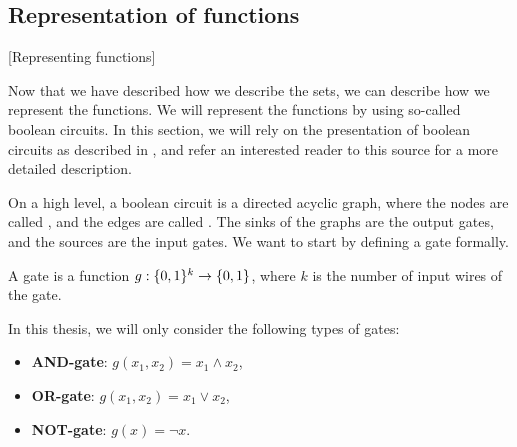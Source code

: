 \subsection{Representation of functions}[Representing functions]

Now that we have described how we describe the sets, we can describe how we represent the functions. We will represent the functions by using so-called boolean circuits. In this section, we will rely on the presentation of boolean circuits as described in , and refer an interested reader to this source for a more detailed description.

On a high level, a boolean circuit is a directed acyclic graph, where the nodes are called , and the edges are called . The sinks of the graphs are the output gates, and the sources are the input gates. We want to start by defining a gate formally.

\begin{definition}[Gate]
    A gate is a function $g : \{0, 1\}^k \rightarrow \{0, 1\}$, where $k$ is the number of input wires of the gate.
\end{definition}

In this thesis, we will only consider the following types of gates:
\begin{itemize}
    \item \textbf{AND-gate}: $g(x_1, x_2) = x_1 \land x_2$,
    \item \textbf{OR-gate}: $g(x_1, x_2) = x_1 \lor x_2$,
    \item \textbf{NOT-gate}: $g(x) = \lnot x$.
\end{itemize}

